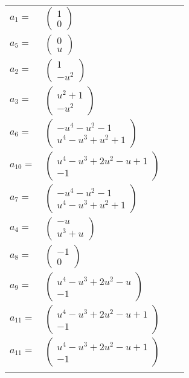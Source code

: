 \documentclass[1p]{elsarticle_modified}
\theoremstyle{definition}
\begin{document}
\begin{tabular}{m{7pt} m{180pt} m{7pt} m{180pt} }
\flushright $a_{1}=$&$\begin{pmatrix}1\\0\end{pmatrix}$ \\
\flushright $a_{5}=$&$\begin{pmatrix}0\\u\end{pmatrix}$ \\
\flushright $a_{2}=$&$\begin{pmatrix}1\\- u^2\end{pmatrix}$ \\
\flushright $a_{3}=$&$\begin{pmatrix}u^2+1\\- u^2\end{pmatrix}$ \\
\flushright $a_{6}=$&$\begin{pmatrix}- u^4- u^2-1\\u^4- u^3+u^2+1\end{pmatrix}$ \\
\flushright $a_{10}=$&$\begin{pmatrix}u^4- u^3+2 u^2- u+1\\-1\end{pmatrix}$ \\
\flushright $a_{7}=$&$\begin{pmatrix}- u^4- u^2-1\\u^4- u^3+u^2+1\end{pmatrix}$ \\
\flushright $a_{4}=$&$\begin{pmatrix}- u\\u^3+u\end{pmatrix}$ \\
\flushright $a_{8}=$&$\begin{pmatrix}-1\\0\end{pmatrix}$ \\
\flushright $a_{9}=$&$\begin{pmatrix}u^4- u^3+2 u^2- u\\-1\end{pmatrix}$ \\
\flushright $a_{11}=$&$\begin{pmatrix}u^4- u^3+2 u^2- u+1\\-1\end{pmatrix}$\\ \flushright $a_{11}=$&$\begin{pmatrix}u^4- u^3+2 u^2- u+1\\-1\end{pmatrix}$\\&\end{tabular}
\end{document}
